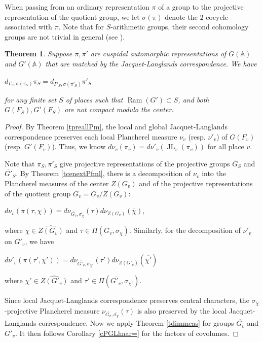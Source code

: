 \documentclass[11pt]{article}
\theoremstyle{plain}
\newtheorem{theorem}{Theorem}[section]
\theoremstyle{remark}
\theoremstyle{definition}
\DeclareMathOperator{\JL}{JL}
\DeclareMathOperator{\ram}{Ram}
\begin{document}
When passing from an ordinary representation $\pi$ of a group to the projective representation of the quotient group, we let $\sigma(\pi)$ denote the $2$-cocycle associated with $\pi$.  
Note that for $S$-arithmetic groups, their second cohomology groups are not trivial in general (see \cite{AdemNaf98}). 
\begin{theorem}\label{ttpvndim}
    Suppose $\pi,\pi'$ are cuspidal automorphic representations of $G(\mathbb{A})$ and $G'(\mathbb{A})$ that are matched by the Jacquet-Langlands correspondence.   
We have
\begin{center}
$d_{\Gamma_S,\sigma(\pi_S)}\pi_S=d_{\Gamma'_S,\sigma(\pi'_S)}\pi'_S$
\end{center}
for any finite set $S$ of places such that  $\ram(G')\subset S$, and both $G(F_S),G'(F_S)$ are not compact modulo the center.  
\end{theorem}
\begin{proof}
By Theorem \ref{tpreallPm}, the local and global Jacquet-Langlands correspondence preserves each local Plancherel measure $\nu_v$ (resp. $\nu'_v$) of $G(F_v)$ (resp. $G'(F_v)$). 
Thus, we know $d\nu_v(\pi_v)=d\nu'_v(\JL_{v}(\pi_v))$ for all place $v$. 


Note that  $\pi_S,\pi'_S$ give projective representations of the projective groups $\overline{G}_S$ and $\overline{G'}_S$.  
By Theorem \ref{tcenextPfml}, there is a decomposition of $\nu_v$ into the Plancherel measures of the center $Z(G_v)$ and of the projective representations of the quotient group $\overline{G_v}=G_v/Z(G_v)$: 
\begin{center}   $d\nu_v(\pi(\tau,\chi))=d\nu_{\overline{G_v},\overline{\sigma_{\chi}}}(\tau)d \nu_{Z(G_v)}(\overline{\chi})$,
\end{center}
where $\chi\in\widehat{Z(G_v)}$ and $\tau\in \Pi(\overline{G_v},\sigma_{\chi})$. 
Similarly, for the decomposition of $\nu'_v$ on $G'_v$, we have
\begin{center} $d\nu'_v(\pi(\tau',\chi'))=d\nu_{\overline{G'_v},\overline{\sigma_{\chi'}}}(\tau')d \nu_{Z(G'_v)}(\overline{\chi'})$
\end{center}
where $\chi'\in\widehat{Z(G'_v)}$ and $\tau'\in \Pi(\overline{G'_v},\sigma_{\chi'})$. 
 
Since local Jacquet-Langlands correspondence preserves central characters,  
the $\sigma_{\chi}$-projective Plancherel measure $\nu_{\overline{G_v},\overline{\sigma_{\chi}}}(\tau)$  is also preserved by the local Jacquet-Langlands correspondence. 
Now we apply Theorem \ref{tdimmeas} for groups $\overline{G_v}$ and $\overline{G'_v}$. 
It then follows Corollary \ref{cPGLhaar=} for the factors of covolumes.  
\end{proof}
\end{document}
